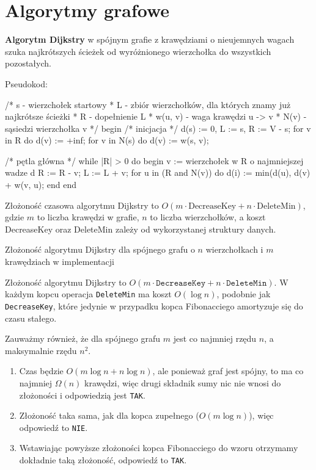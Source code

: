 \section{Algorytmy grafowe}

\textbf{Algorytm Dijkstry} w spójnym grafie z krawędziami o nieujemnych wagach szuka najkrótszych ścieżek od wyróżnionego wierzchołka do wszystkich pozostałych.

Pseudokod:
\begin{cpp}
/* s - wierzchołek startowy
 * L - zbiór wierzchołków, dla których znamy już najkrótsze ścieżki
 * R - dopełnienie L
 * w(u, v) - waga krawędzi u -> v
 * N(v) - sąsiedzi wierzchołka v */
begin
    /* inicjacja */
    d(s) := 0, L := {s}, R := V - {s};
    for v in R do d(v) := +inf;
    for v in N(s) do d(v) := w(s, v);

    /* pętla główna */
    while |R| > 0 do
    begin
        v := wierzchołek w R o najmniejszej wadze d
        R := R - {v};
        L := L + {v};
        for u in (R and N(v)) do d(i) := min(d(u), d(v) + w(v, u);
    end
end
\end{cpp}

Złożoność czasowa algorytmu Dijkstry to $O(m \cdot \text{DecreaseKey} + n \cdot \text{DeleteMin})$, gdzie $m$ to liczba krawędzi w grafie, $n$ to liczba wierzchołków, a koszt DecreaseKey oraz DeleteMin zależy od wykorzystanej struktury danych.

\begin{exam}
    Złożoność algorytmu Dijkstry dla spójnego grafu o $n$ wierzchołkach i $m$ krawędziach w implementacji
    
    Złożoność algorytmu Dijkstry to $O(m\cdot\texttt{DecreaseKey}+n\cdot\texttt{DeleteMin})$. W każdym kopcu operacja \texttt{DeleteMin} ma koszt $O(\log{n})$, podobnie jak \texttt{DecreaseKey}, które jedynie w przypadku kopca Fibonacciego amortyzuje się do czasu stałego.

    Zauważmy również, że dla spójnego grafu $m$ jest co najmniej rzędu $n$, a maksymalnie rzędu $n^2$.

    \begin{enumerate}[\bf A.]
        \item Czas będzie $O(m\log{n}+n\log{n})$, ale ponieważ graf jest spójny, to ma co najmniej $\Omega(n)$ krawędzi, więc drugi składnik sumy nic nie wnosi do złożoności i odpowiedzią jest \texttt{TAK}.

        \item Złożoność taka sama, jak dla kopca zupełnego ($O(m \log n)$), więc odpowiedź to \texttt{NIE}.

        \item Wstawiając powyższe złożoności kopca Fibonacciego do wzoru otrzymamy dokładnie taką złożoność, odpowiedź to \texttt{TAK}.
    \end{enumerate}
\end{exam}

